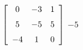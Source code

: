 {$\left[ \begin {array}{ccc} 0&-3&1\\\noalign{\medskip}5&-5&5
\\\noalign{\medskip}-4&1&0\end {array} \right]
$} 
{$-5$}



  

